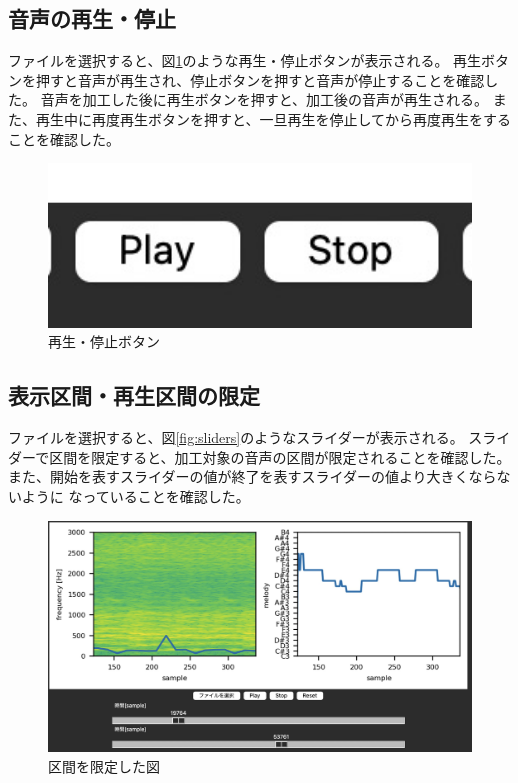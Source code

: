 \documentclass[a4paper,11pt]{jsarticle}
\begin{document}
\subsection{音声の再生・停止}
ファイルを選択すると、図\ref{fig:play_stop_button}のような再生・停止ボタンが表示される。
再生ボタンを押すと音声が再生され、停止ボタンを押すと音声が停止することを確認した。
音声を加工した後に再生ボタンを押すと、加工後の音声が再生される。
また、再生中に再度再生ボタンを押すと、一旦再生を停止してから再度再生をすることを確認した。

\begin{figure}[h]
\centering
\includegraphics[keepaspectratio, width=13cm]
{./images/play_stop_buttons.jpg}
\caption{再生・停止ボタン}
\label{fig:play_stop_button}
\end{figure}

\subsection{表示区間・再生区間の限定}
ファイルを選択すると、図\ref{fig:sliders}のようなスライダーが表示される。
スライダーで区間を限定すると、加工対象の音声の区間が限定されることを確認した。
また、開始を表すスライダーの値が終了を表すスライダーの値より大きくならないように
なっていることを確認した。

\begin{figure}[h]
\centering
\includegraphics[keepaspectratio, width=13cm]
{./images/filtered_figures.jpg}
\caption{区間を限定した図}
\label{fig:filtered_figures}
\end{figure}
\end{document}
